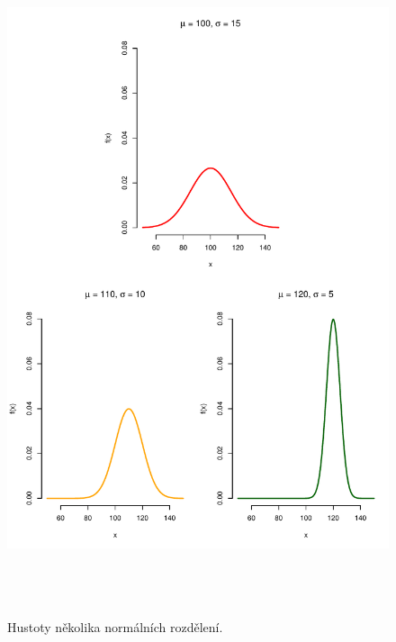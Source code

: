 \begin{figure}[p]\centering
\includegraphics[width=140mm, height=198mm]{img/ukazka-obr03}
\caption{Hustoty několika normálních rozdělení.}
\label{obr03:Nhust:podruhe}

\end{figure}
